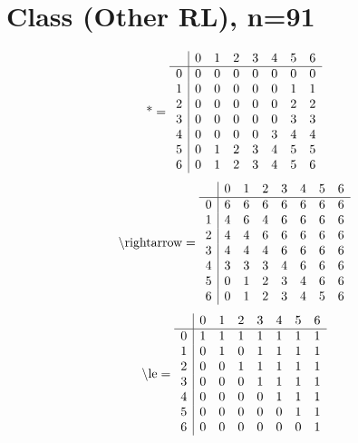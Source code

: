 \documentclass[11pt]{article}
\begin{document}
\section{Class (Other RL), n=91}
\[\text{*} = 
\begin{array}{r | r r r r r r r}
 & 0 & 1 & 2 & 3 & 4 & 5 & 6 \\ \hline
0 & 0 & 0 & 0 & 0 & 0 & 0 & 0 \\
1 & 0 & 0 & 0 & 0 & 0 & 1 & 1 \\
2 & 0 & 0 & 0 & 0 & 0 & 2 & 2 \\
3 & 0 & 0 & 0 & 0 & 0 & 3 & 3 \\
4 & 0 & 0 & 0 & 0 & 3 & 4 & 4 \\
5 & 0 & 1 & 2 & 3 & 4 & 5 & 5 \\
6 & 0 & 1 & 2 & 3 & 4 & 5 & 6 \\
\end{array}
\]
\[\text{\textbackslash rightarrow} = 
\begin{array}{r | r r r r r r r}
 & 0 & 1 & 2 & 3 & 4 & 5 & 6 \\ \hline
0 & 6 & 6 & 6 & 6 & 6 & 6 & 6 \\
1 & 4 & 6 & 4 & 6 & 6 & 6 & 6 \\
2 & 4 & 4 & 6 & 6 & 6 & 6 & 6 \\
3 & 4 & 4 & 4 & 6 & 6 & 6 & 6 \\
4 & 3 & 3 & 3 & 4 & 6 & 6 & 6 \\
5 & 0 & 1 & 2 & 3 & 4 & 6 & 6 \\
6 & 0 & 1 & 2 & 3 & 4 & 5 & 6 \\
\end{array}
\]
\[\text{\textbackslash le} = 
\begin{array}{r | r r r r r r r}
 & 0 & 1 & 2 & 3 & 4 & 5 & 6 \\ \hline
0 & 1 & 1 & 1 & 1 & 1 & 1 & 1 \\
1 & 0 & 1 & 0 & 1 & 1 & 1 & 1 \\
2 & 0 & 0 & 1 & 1 & 1 & 1 & 1 \\
3 & 0 & 0 & 0 & 1 & 1 & 1 & 1 \\
4 & 0 & 0 & 0 & 0 & 1 & 1 & 1 \\
5 & 0 & 0 & 0 & 0 & 0 & 1 & 1 \\
6 & 0 & 0 & 0 & 0 & 0 & 0 & 1 \\
\end{array}
\]
\end{document}
